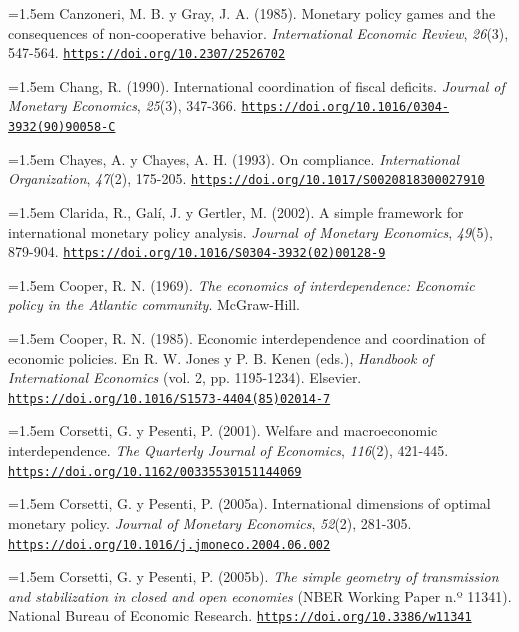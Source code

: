 \documentclass[10pt,a4paper]{article}
\begin{document}
\noindent\hangindent=1.5em Canzoneri, M. B. y Gray, J. A. (1985). Monetary policy games and the consequences of non-cooperative behavior. \textit{International Economic Review}, \textit{26}(3), 547-564. \href{https://doi.org/10.2307/2526702}{\nolinkurl{https://doi.org/10.2307/2526702}}

\noindent\hangindent=1.5em Chang, R. (1990). International coordination of fiscal deficits. \textit{Journal of Monetary Economics}, \textit{25}(3), 347-366. \href{https://doi.org/10.1016/0304-3932(90)90058-C}{\nolinkurl{https://doi.org/10.1016/0304-3932(90)90058-C}}

\noindent\hangindent=1.5em Chayes, A. y Chayes, A. H. (1993). On compliance. \textit{International Organization}, \textit{47}(2), 175-205. \href{https://doi.org/10.1017/S0020818300027910}{\nolinkurl{https://doi.org/10.1017/S0020818300027910}}

\noindent\hangindent=1.5em Clarida, R., Galí, J. y Gertler, M. (2002). A simple framework for international monetary policy analysis. \textit{Journal of Monetary Economics}, \textit{49}(5), 879-904. \href{https://doi.org/10.1016/S0304-3932(02)00128-9}{\nolinkurl{https://doi.org/10.1016/S0304-3932(02)00128-9}}

\noindent\hangindent=1.5em Cooper, R. N. (1969). \textit{The economics of interdependence: Economic policy in the Atlantic community}. McGraw-Hill.

\noindent\hangindent=1.5em Cooper, R. N. (1985). Economic interdependence and coordination of economic policies. En R. W. Jones y P. B. Kenen (eds.), \textit{Handbook of International Economics} (vol. 2, pp. 1195-1234). Elsevier. \href{https://doi.org/10.1016/S1573-4404(85)02014-7}{\nolinkurl{https://doi.org/10.1016/S1573-4404(85)02014-7}}

\noindent\hangindent=1.5em Corsetti, G. y Pesenti, P. (2001). Welfare and macroeconomic interdependence. \textit{The Quarterly Journal of Economics}, \textit{116}(2), 421-445. \href{https://doi.org/10.1162/00335530151144069}{\nolinkurl{https://doi.org/10.1162/00335530151144069}}

\noindent\hangindent=1.5em Corsetti, G. y Pesenti, P. (2005a). International dimensions of optimal monetary policy. \textit{Journal of Monetary Economics}, \textit{52}(2), 281-305. \href{https://doi.org/10.1016/j.jmoneco.2004.06.002}{\nolinkurl{https://doi.org/10.1016/j.jmoneco.2004.06.002}}

\noindent\hangindent=1.5em Corsetti, G. y Pesenti, P. (2005b). \textit{The simple geometry of transmission and stabilization in closed and open economies} (NBER Working Paper n.º 11341). National Bureau of Economic Research. \href{https://doi.org/10.3386/w11341}{\nolinkurl{https://doi.org/10.3386/w11341}}
\end{document}

